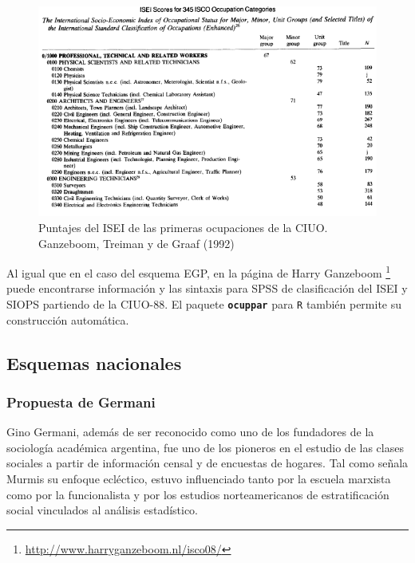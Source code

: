 \documentclass[
]{book}
\begin{document}
\begin{figure}

{\centering \includegraphics[width=0.8\linewidth]{imagenes/isei} 

}

\caption{Puntajes del ISEI de las primeras ocupaciones de la CIUO. Ganzeboom, Treiman y de Graaf (1992)}\label{fig:unnamed-chunk-64}
\end{figure}

Al igual que en el caso del esquema EGP, en la página de Harry Ganzeboom \footnote{\url{http://www.harryganzeboom.nl/isco08/}} puede encontrarse información y las sintaxis para SPSS de clasificación del ISEI y SIOPS partiendo de la CIUO-88. El paquete \textbf{\texttt{ocuppar}} para \texttt{R} también permite su construcción automática.

\hypertarget{esquemas-nacionales}{%
\subsection{Esquemas nacionales}\label{esquemas-nacionales}}

\hypertarget{propuesta-de-germani}{%
\subsubsection{Propuesta de Germani}\label{propuesta-de-germani}}

Gino Germani, además de ser reconocido como uno de los fundadores de la sociología académica argentina, fue uno de los pioneros en el estudio de las clases sociales a partir de información censal y de encuestas de hogares. Tal como señala Murmis \citep{Germani.etal2010} su enfoque ecléctico, estuvo influenciado tanto por la escuela marxista como por la funcionalista y por los estudios norteamericanos de estratificación social vinculados al análisis estadístico.
\end{document}
